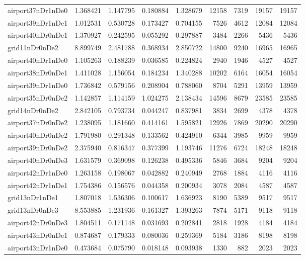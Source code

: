 \begin{longtable}{|l|r|r|r|r|r|r|r|r|}
airport37nDr1nDe0 & 1.368421 & 1.147795 & 0.180884 & 1.328679 & 12158 & 7319 & 19157 & 19157 \\
airport39nDr1nDe1 & 1.012531 & 0.530728 & 0.173427 & 0.704155 & 7526 & 4612 & 12084 & 12084 \\
airport40nDr0nDe1 & 1.370927 & 0.242595 & 0.055292 & 0.297887 & 3484 & 2266 & 5436 & 5436 \\
grid11nDr0nDe2 & 8.899749 & 2.481788 & 0.368934 & 2.850722 & 14800 & 9240 & 16965 & 16965 \\
airport40nDr1nDe0 & 1.105263 & 0.188239 & 0.036585 & 0.224824 & 2940 & 1946 & 4527 & 4527 \\
airport38nDr0nDe1 & 1.411028 & 1.156054 & 0.184234 & 1.340288 & 10202 & 6164 & 16054 & 16054 \\
airport39nDr1nDe0 & 1.736842 & 0.579156 & 0.208904 & 0.788060 & 8704 & 5291 & 13959 & 13959 \\
airport35nDr0nDe2 & 1.142857 & 1.114159 & 1.024275 & 2.138434 & 14596 & 8679 & 23585 & 23585 \\
grid14nDr0nDe2 & 2.842105 & 0.793734 & 0.044247 & 0.837981 & 3834 & 2699 & 4378 & 4378 \\
airport37nDr0nDe2 & 1.238095 & 1.181660 & 0.414161 & 1.595821 & 12926 & 7869 & 20290 & 20290 \\
airport40nDr0nDe2 & 1.791980 & 0.291348 & 0.133562 & 0.424910 & 6344 & 3985 & 9959 & 9959 \\
airport39nDr0nDe2 & 2.375940 & 0.816347 & 0.377399 & 1.193746 & 11276 & 6724 & 18248 & 18248 \\
airport40nDr0nDe3 & 1.631579 & 0.369098 & 0.126238 & 0.495336 & 5846 & 3684 & 9204 & 9204 \\
airport42nDr1nDe0 & 1.263158 & 0.198067 & 0.042882 & 0.240949 & 2768 & 1884 & 4116 & 4116 \\
airport42nDr1nDe1 & 1.754386 & 0.156576 & 0.044358 & 0.200934 & 3078 & 2084 & 4587 & 4587 \\
grid13nDr1nDe1 & 1.807018 & 1.536306 & 0.100617 & 1.636923 & 8190 & 5389 & 9517 & 9517 \\
grid13nDr0nDe3 & 8.553885 & 1.231936 & 0.161327 & 1.393263 & 7874 & 5171 & 9118 & 9118 \\
airport42nDr0nDe3 & 1.804511 & 0.171148 & 0.031693 & 0.202841 & 2818 & 1928 & 4184 & 4184 \\
airport43nDr0nDe1 & 0.874687 & 0.179333 & 0.080036 & 0.259369 & 5184 & 3186 & 8198 & 8198 \\
airport43nDr1nDe0 & 0.473684 & 0.075790 & 0.018148 & 0.093938 & 1330 & 882 & 2023 & 2023 \\

\end{longtable}

